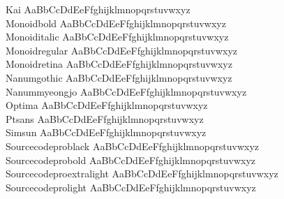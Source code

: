 \begin{tabbing}
Kai \> { AaBbCcDdEeFfghijklmnopqrstuvwxyz} \\
Monoidbold \> { AaBbCcDdEeFfghijklmnopqrstuvwxyz} \\
Monoiditalic \> { AaBbCcDdEeFfghijklmnopqrstuvwxyz} \\
Monoidregular \> { AaBbCcDdEeFfghijklmnopqrstuvwxyz} \\
Monoidretina \> { AaBbCcDdEeFfghijklmnopqrstuvwxyz} \\
Nanumgothic \> { AaBbCcDdEeFfghijklmnopqrstuvwxyz} \\
Nanummyeongjo \> { AaBbCcDdEeFfghijklmnopqrstuvwxyz} \\
Optima \> { AaBbCcDdEeFfghijklmnopqrstuvwxyz} \\
Ptsans \> { AaBbCcDdEeFfghijklmnopqrstuvwxyz} \\
Simsun \> { AaBbCcDdEeFfghijklmnopqrstuvwxyz} \\
Sourcecodeproblack \> { AaBbCcDdEeFfghijklmnopqrstuvwxyz} \\
Sourcecodeprobold \> { AaBbCcDdEeFfghijklmnopqrstuvwxyz} \\
Sourcecodeproextralight \> { AaBbCcDdEeFfghijklmnopqrstuvwxyz} \\
Sourcecodeprolight \> { AaBbCcDdEeFfghijklmnopqrstuvwxyz} \\

\end{tabbing}
